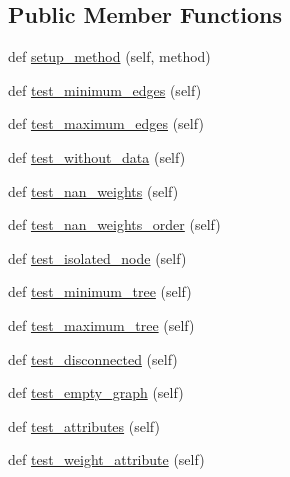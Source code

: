 \subsection*{Public Member Functions}
\begin{DoxyCompactItemize}
\item 
def \hyperlink{classnetworkx_1_1algorithms_1_1tree_1_1tests_1_1test__mst_1_1MinimumSpanningTreeTestBase_ae77ee8e9a98778766e72757a2decbf06}{setup\+\_\+method} (self, method)
\item 
def \hyperlink{classnetworkx_1_1algorithms_1_1tree_1_1tests_1_1test__mst_1_1MinimumSpanningTreeTestBase_ad98ffbda896c314a0a723cbd451f5517}{test\+\_\+minimum\+\_\+edges} (self)
\item 
def \hyperlink{classnetworkx_1_1algorithms_1_1tree_1_1tests_1_1test__mst_1_1MinimumSpanningTreeTestBase_aa6c241379febe26ad4bf5330b4266a23}{test\+\_\+maximum\+\_\+edges} (self)
\item 
def \hyperlink{classnetworkx_1_1algorithms_1_1tree_1_1tests_1_1test__mst_1_1MinimumSpanningTreeTestBase_a79983c689d2b18a86aef6a4a403e8ae2}{test\+\_\+without\+\_\+data} (self)
\item 
def \hyperlink{classnetworkx_1_1algorithms_1_1tree_1_1tests_1_1test__mst_1_1MinimumSpanningTreeTestBase_a18981261d644061fcb1b5396e4847987}{test\+\_\+nan\+\_\+weights} (self)
\item 
def \hyperlink{classnetworkx_1_1algorithms_1_1tree_1_1tests_1_1test__mst_1_1MinimumSpanningTreeTestBase_a00e4274986d2a1ed12a24bab73ab0d05}{test\+\_\+nan\+\_\+weights\+\_\+order} (self)
\item 
def \hyperlink{classnetworkx_1_1algorithms_1_1tree_1_1tests_1_1test__mst_1_1MinimumSpanningTreeTestBase_a90ccccd094e63066beb51a73d8af3a1b}{test\+\_\+isolated\+\_\+node} (self)
\item 
def \hyperlink{classnetworkx_1_1algorithms_1_1tree_1_1tests_1_1test__mst_1_1MinimumSpanningTreeTestBase_a61d1a181060e3040eb9ac4737355e05a}{test\+\_\+minimum\+\_\+tree} (self)
\item 
def \hyperlink{classnetworkx_1_1algorithms_1_1tree_1_1tests_1_1test__mst_1_1MinimumSpanningTreeTestBase_ab9bfa9de22a7bc41568950efe99b82f6}{test\+\_\+maximum\+\_\+tree} (self)
\item 
def \hyperlink{classnetworkx_1_1algorithms_1_1tree_1_1tests_1_1test__mst_1_1MinimumSpanningTreeTestBase_ab9821b27cd95624771929d8a342d1f75}{test\+\_\+disconnected} (self)
\item 
def \hyperlink{classnetworkx_1_1algorithms_1_1tree_1_1tests_1_1test__mst_1_1MinimumSpanningTreeTestBase_ad31b02e36f74c990ed53b4d2e0bc7ce1}{test\+\_\+empty\+\_\+graph} (self)
\item 
def \hyperlink{classnetworkx_1_1algorithms_1_1tree_1_1tests_1_1test__mst_1_1MinimumSpanningTreeTestBase_ae0c9db3f2d109ec00b9652cc454a046e}{test\+\_\+attributes} (self)
\item 
def \hyperlink{classnetworkx_1_1algorithms_1_1tree_1_1tests_1_1test__mst_1_1MinimumSpanningTreeTestBase_aff6389350c3e41d34497ce0675b05c9b}{test\+\_\+weight\+\_\+attribute} (self)
\end{DoxyCompactItemize}
